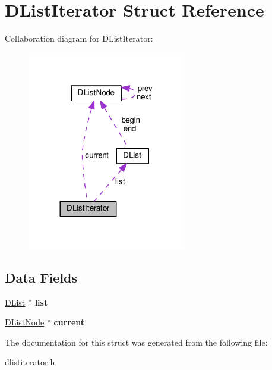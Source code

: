 \hypertarget{struct_d_list_iterator}{}\section{D\+List\+Iterator Struct Reference}
\label{struct_d_list_iterator}


Collaboration diagram for D\+List\+Iterator\+:
\nopagebreak
\begin{figure}[H]
\begin{center}
\leavevmode
\includegraphics[width=197pt]{struct_d_list_iterator__coll__graph}
\end{center}
\end{figure}
\subsection*{Data Fields}
\begin{DoxyCompactItemize}
\item 
\hyperlink{struct_d_list}{D\+List} $\ast$ {\bfseries list}\hypertarget{struct_d_list_iterator_a01747f7951efcf8a061d60216b3d2389}{}\label{struct_d_list_iterator_a01747f7951efcf8a061d60216b3d2389}

\item 
\hyperlink{struct_d_list_node}{D\+List\+Node} $\ast$ {\bfseries current}\hypertarget{struct_d_list_iterator_aee039c1f5c2abd2f304a32b3e44f8d50}{}\label{struct_d_list_iterator_aee039c1f5c2abd2f304a32b3e44f8d50}

\end{DoxyCompactItemize}


The documentation for this struct was generated from the following file\+:\begin{DoxyCompactItemize}
\item 
dlistiterator.\+h\end{DoxyCompactItemize}
